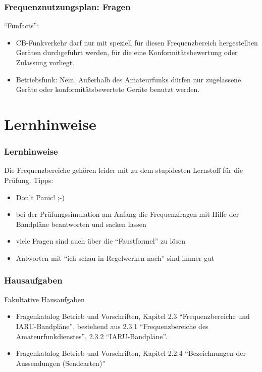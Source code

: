 \begin{frame}
    \frametitle{Frequenznutzungsplan: Fragen}

    ``Funfacts'':
    
    \begin{itemize}
        \item CB-Funkverkehr darf nur mit speziell für diesen Frequenzbereich
              hergestellten Geräten durchgeführt werden, für die eine
              Konformitätsbewertung oder Zulassung vorliegt.
        \item Betriebsfunk: Nein. Außerhalb des Amateurfunks dürfen nur zugelassene Geräte oder
              konformitätsbewertete Geräte benutzt werden.
    \end{itemize}

\end{frame}

\section{Lernhinweise}

\begin{frame}
    \frametitle{Lernhinweise}

    Die Frequenzbereiche gehören leider mit zu dem stupidesten Lernstoff für die
    Prüfung. Tipps:

    \begin{itemize}
        \item Don't Panic! ;-)
        \item bei der Prüfungssimulation am Anfang die Frequenzfragen mit Hilfe
              der Bandpläne beantworten und sacken lassen
        \item viele Fragen sind auch über die ``Faustformel'' zu lösen
        \item Antworten mit ``ich schau in Regelwerken nach'' sind immer gut
    \end{itemize}

\end{frame}

\begin{frame}
  \frametitle{Hausaufgaben}

  \begin{alertblock}{Fakultative Hausaufgaben}
    \begin{itemize}
      \item Fragenkatalog Betrieb und Vorschriften, Kapitel 2.3 ``Frequenzbereiche und IARU-Bandpläne'', bestehend aus 2.3.1 ``Frequenzbereiche des Amateurfunkdienstes'', 2.3.2 ``IARU-Bandpläne''.
      \item Fragenkatalog Betrieb und Vorschriften, Kapitel 2.2.4 ``Bezeichnungen der Aussendungen (Sendearten)''
    \end{itemize}
  \end{alertblock}
\end{frame}

